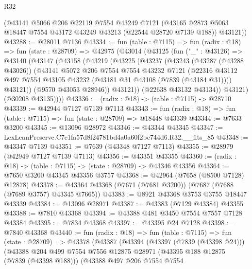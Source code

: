 \begin{lexlean}{R32}
\begin{coremodule}
      (@43141
        @5066
        @206
        @22119
        @7554
        @43249
        @7121
        (@43165 @2873 @5063 @18447 @7554 @43172 @43249 @43213 (@22544 @28720 @7139 @188))
        @43121))
@43288 := @28011 @7136
@43334 := fun (table : @7115) =>
  fun (radix : @18) =>
  fun (state : @28709) =>
  @42975
    (@43014
      (@43125
        (fun ("_" : @43126) =>
        @43140
          (@43147
            (@43158
              (@43219
                (@43225
                  (@43237
                    (@43243
                      (@43287 (@43288 @43026))
                      (@43141
                        @5072
                        @206
                        @7554
                        @7554
                        @43232
                        @7121
                        (@22316
                          @43112
                          @497
                          @7554
                          @43105
                          @43232
                          (@43181 @31 @43108 (@7839 (@43184 @31))))
                        @43121))
                    (@9570 @43053 @28946))
                  @43121))
              (@22638 @43132 @43134))
            @43121)
          (@30208 @43135))))
@43336 := (radix : @18) -> (table : @7115) -> @28710
@43339 := @42944 @7127 @7139 @7113
@43343 := fun (radix : @18) => fun (table : @7115) => fun (state : @28709) => @18448 @43339
@43344 := @7633 @3200
@43345 := @13096 @28972
@43346 := @43344 @43345
@43347 := LexLeanPreserve.C7e1fa57d8f24781bd4a0a60f2bc744d6.R32.__fits_85
@43348 := @43347 @7139
@43351 := @7639 (@43348 @7127 @7113)
@43355 := @28979 (@42949 @7127 @7139 @7113)
@43356 := @43351 @43355
@43360 := (radix : @18) -> (table : @7115) -> (state : @28709) -> @43346 @43356
@43364 := @7650 @3200 @43345 @43356 @3757
@43368 := @42964 (@7658 (@8500 @7128) @12878)
@43378 := @43364 @43368 (@7671 (@7681 @3200)) (@7687 (@7688 (@7689 @3757) @43345 @7665))
@43383 := @8921 @43368 @3753 @3755 @18447 @43339
@43384 := @13096 @28971
@43387 := @43383 (@7129 @43384) @43355
@43388 := @7810 @43368
@43394 := @43388 @481 @3450 @7554 @7557 @7128 @43384
@43395 := @7834 @43368
@43397 := @43395 @24 @7128
@43398 := @7840 @43368
@43440 := fun (radix : @18) =>
  fun (table : @7115) =>
  fun (state : @28709) =>
  @43378
    (@43387
      (@43394
        (@43397 (@7839 (@43398 @24)))
        (@43388
          @204
          @499
          @7554
          @7556
          @12875
          @28971
          (@43395 @188 @12875 (@7839 (@43398 @188)))
          (@43388
            @497
            @206
            @7554
            @7554

\end{coremodule}
\end{lexlean}

